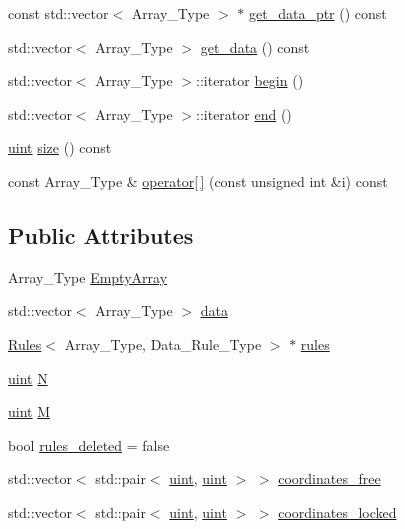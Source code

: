 \textbf{ }\par
\begin{DoxyCompactItemize}
\item 
const std\+::vector$<$ Array\+\_\+\+Type $>$ $\ast$ \hyperlink{class_power_set_a99cf1aa56e63a16c023bf7057b0b9288}{get\+\_\+data\+\_\+ptr} () const
\item 
std\+::vector$<$ Array\+\_\+\+Type $>$ \hyperlink{class_power_set_a4de44631d9a7967db4dd791d42166115}{get\+\_\+data} () const
\item 
std\+::vector$<$ Array\+\_\+\+Type $>$\+::iterator \hyperlink{class_power_set_abed9d58db924366d8a38baf168131fc3}{begin} ()
\item 
std\+::vector$<$ Array\+\_\+\+Type $>$\+::iterator \hyperlink{class_power_set_ac734ed684aa314b722a05d423c607a38}{end} ()
\item 
\hyperlink{typedefs_8hpp_a91ad9478d81a7aaf2593e8d9c3d06a14}{uint} \hyperlink{class_power_set_a80e7099e115369326e6c873a92d270f9}{size} () const
\item 
const Array\+\_\+\+Type \& \hyperlink{class_power_set_acc822131a9fbfd5b87f85b675f293d39}{operator\mbox{[}$\,$\mbox{]}} (const unsigned int \&i) const
\end{DoxyCompactItemize}

\subsection*{Public Attributes}
\begin{DoxyCompactItemize}
\item 
Array\+\_\+\+Type \hyperlink{class_power_set_a367db2c97e0301dd0dd78e5e4b458d34}{Empty\+Array}
\item 
std\+::vector$<$ Array\+\_\+\+Type $>$ \hyperlink{class_power_set_af456c157d157692ba5890c549c51af75}{data}
\item 
\hyperlink{class_rules}{Rules}$<$ Array\+\_\+\+Type, Data\+\_\+\+Rule\+\_\+\+Type $>$ $\ast$ \hyperlink{class_power_set_afa542ecc31858c8644d1e76078eb1713}{rules}
\item 
\hyperlink{typedefs_8hpp_a91ad9478d81a7aaf2593e8d9c3d06a14}{uint} \hyperlink{class_power_set_ab3b65c1b9bce012f4aabe5acae093acd}{N}
\item 
\hyperlink{typedefs_8hpp_a91ad9478d81a7aaf2593e8d9c3d06a14}{uint} \hyperlink{class_power_set_a91d328d5ace1ed6a8587a66af905ae98}{M}
\item 
bool \hyperlink{class_power_set_a08b6baf1e244e023d997ddaecbc2116f}{rules\+\_\+deleted} = false
\item 
std\+::vector$<$ std\+::pair$<$ \hyperlink{typedefs_8hpp_a91ad9478d81a7aaf2593e8d9c3d06a14}{uint}, \hyperlink{typedefs_8hpp_a91ad9478d81a7aaf2593e8d9c3d06a14}{uint} $>$ $>$ \hyperlink{class_power_set_a99cfef97c3a457ea7be1b000b39f41d9}{coordinates\+\_\+free}
\item 
std\+::vector$<$ std\+::pair$<$ \hyperlink{typedefs_8hpp_a91ad9478d81a7aaf2593e8d9c3d06a14}{uint}, \hyperlink{typedefs_8hpp_a91ad9478d81a7aaf2593e8d9c3d06a14}{uint} $>$ $>$ \hyperlink{class_power_set_ac5cdec06502e8bd20e36fca3abbb9a3e}{coordinates\+\_\+locked}
\end{DoxyCompactItemize}


